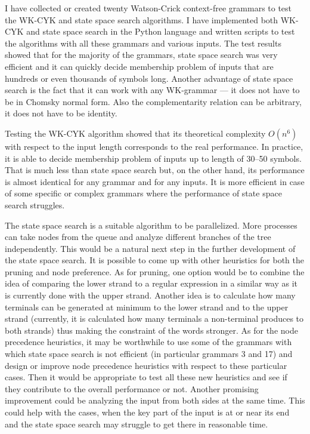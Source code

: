 I have collected or created twenty Watson-Crick context-free grammars to test the WK-CYK and state space search algorithms.
I have implemented both WK-CYK and state space search in the Python language and written scripts to test the algorithms with all these grammars and various inputs. The test results showed that for the majority of the grammars, state space search was very efficient and it can quickly decide membership problem of inputs that are hundreds or even thousands of symbols long. Another advantage of state space search is the fact that it can work with any WK-grammar --- it does not have to be in Chomsky normal form. Also the complementarity relation can be arbitrary, it does not have to be identity.

Testing the WK-CYK algorithm showed that its theoretical complexity $O(n^6)$ with respect to the input length corresponds to the real performance. In practice, it is able to decide membership problem of inputs up to length of 30--50 symbols. That is much less than state space search but, on the other hand, its performance is almost identical for any grammar and for any inputs. It is more efficient in case of some specific or complex grammars where the performance of state space search struggles.

The state space search is a suitable algorithm to be parallelized. More processes can take nodes from the queue and analyze different branches of the tree independently. This would be a natural next step in the further development of the state space search.
It is possible to come up with other heuristics for both the pruning and node preference. As for pruning, one option would be to combine the idea of comparing the lower strand to a regular expression in a similar way as it is currently done with the upper strand. Another idea is to calculate how many terminals can be generated at minimum to the lower strand and to the upper strand (currently, it is calculated how many terminals a non-terminal produces to both strands) thus making the constraint of the words stronger.
As for the node precedence heuristics, it may be worthwhile to use some of the grammars with which state space search is not efficient (in particular grammars 3 and 17) and design or improve node precedence heuristics with respect to these particular cases. Then it would be appropriate to test all these new heuristics and see if they contribute to the overall performance or not.
Another promising improvement could be analyzing the input from both sides at the same time. This could help with the cases, when the key part of the input is at or near its end and the state space search may struggle to get there in reasonable time.
